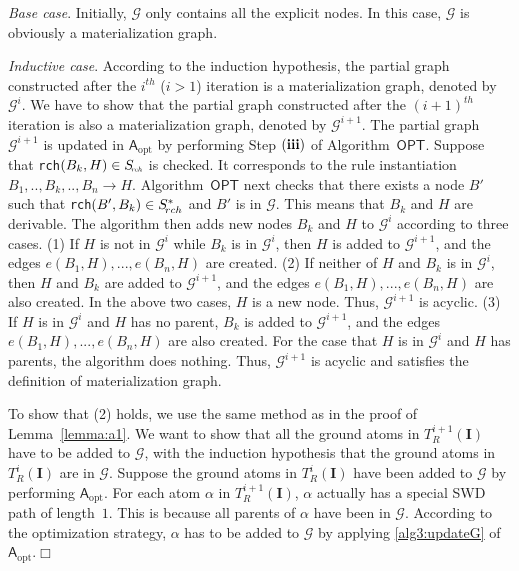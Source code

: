\emph{Base case}. Initially, $\mathcal{G}$ only contains all the explicit nodes.
In this case, $\mathcal{G}$ is obviously a materialization graph.

\emph{Inductive case}.
According to the induction hypothesis, the partial graph constructed after
the $i^{th}$ ($i>1$) iteration is a materialization graph, denoted by $\mathcal{G}^{i}$.
We have to show that the partial graph constructed after the $(i+1)^{th}$ iteration is
also a materialization graph, denoted by $\mathcal{G}^{i+1}$.
The partial graph $\mathcal{G}^{i+1}$ is updated in $\mathsf{A}_{\text{opt}}$ by performing Step $(\textbf{\romannumeral3})$
of Algorithm~$\mathsf{OPT}$.
Suppose that \texttt{rch}$(B_k,H)\in S_{\textit{\!\tiny rch}}$ is checked.
It corresponds to the rule instantiation $B_1,..,B_k,..,B_n\rightarrow H$.
Algorithm~$\mathsf{OPT}$ next checks that there exists a node $B'$ such that
\texttt{rch}$(B',B_k)\in S^*_{\!\tiny rch}$
and $B'$ is in $\mathcal{G}$. This means that $B_k$ and $H$ are derivable.
The algorithm then adds new nodes $B_k$ and $H$ to $\mathcal{G}^{i}$
according to three cases.
(1) If $H$ is not in $\mathcal{G}^{i}$ while $B_k$ is in $\mathcal{G}^{i}$,
then $H$ is added to $\mathcal{G}^{i+1}$, and the edges $e(B_1, H),...,e(B_n, H)$ are created.
(2) If neither of $H$ and $B_k$ is in $\mathcal{G}^{i}$,
then $H$ and $B_k$ are added to $\mathcal{G}^{i+1}$, and the edges $e(B_1, H),...,e(B_n, H)$ are also created.
In the above two cases, $H$ is a new node. Thus,
$\mathcal{G}^{i+1}$ is acyclic.
(3) If $H$ is in $\mathcal{G}^{i}$ and $H$ has no parent,
$B_k$ is added to $\mathcal{G}^{i+1}$, and the edges $e(B_1, H),...,e(B_n, H)$ are also created.
For the case that $H$ is in $\mathcal{G}^{i}$ and $H$ has parents,
the algorithm does nothing.
Thus, $\mathcal{G}^{i+1}$ is acyclic and satisfies the definition of materialization graph.

To show that (2) holds, we use the same method as in the proof of Lemma~\ref{lemma:a1}.
We want to show that all the ground atoms in $T_R^{i+1}(\textbf{I})$ have to be added to $\mathcal{G}$,
with the induction hypothesis that the ground atoms in $T_R^{i}(\textbf{I})$ are in $\mathcal{G}$.
Suppose the ground atoms in $T_R^{i}(\textbf{I})$ have been added to $\mathcal{G}$ by
performing $\mathsf{A}_{\text{opt}}$.
For each atom $\alpha$ in $T_R^{i+1}(\textbf{I})$, $\alpha$ actually has a special SWD path
of length~$1$. This is because all parents of $\alpha$ have been in $\mathcal{G}$.
According to the optimization strategy, $\alpha$ has to be added to $\mathcal{G}$ by applying \ref{alg3:updateG}
of $\mathsf{A}_{\text{opt}}$.\hfill$\Box$


